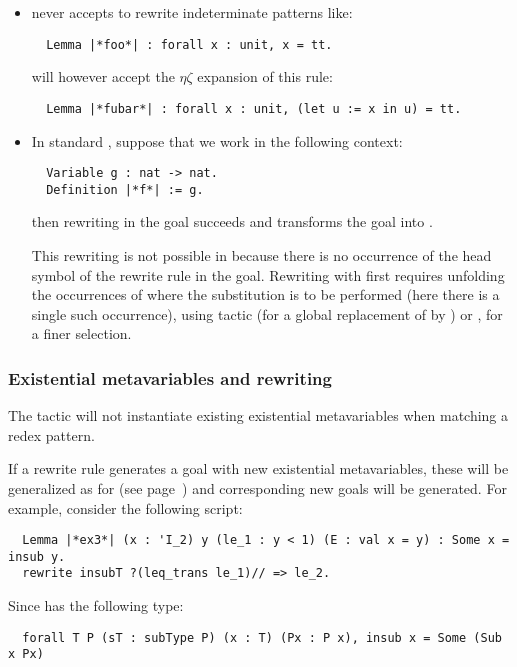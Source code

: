 \begin{itemize}
\item \ssr{} never accepts to rewrite indeterminate patterns like:
\begin{lstlisting}
  Lemma |*foo*| : forall x : unit, x = tt.
\end{lstlisting}
\ssr{} will however accept the $\eta\zeta$ expansion of this rule:
\begin{lstlisting}
  Lemma |*fubar*| : forall x : unit, (let u := x in u) = tt.
\end{lstlisting}
\item In standard \Coq{}, suppose that we work in the following context:
\begin{lstlisting}
  Variable g : nat -> nat.
  Definition |*f*| := g.
\end{lstlisting}
then rewriting  in the goal
 succeeds
and transforms the goal into .

This rewriting is not possible in \ssr{} because there is no
occurrence of the head symbol  of the rewrite rule in the
goal. Rewriting with  first requires unfolding the occurrences of
 where the substitution is to be performed (here there is a single
such occurrence), using tactic  (for a global
replacement of  by ) or , for a
finer selection.
\end{itemize}

\subsubsection*{Existential metavariables and rewriting}
\label{ssec:rewcaveats}
The  tactic will not instantiate existing existential
metavariables when matching a redex pattern.

If a rewrite rule generates a goal
with new existential metavariables, these will be generalized as for 
(see page~\pageref{sssec:apply}) and corresponding new goals will be generated.
For example, consider the following script:

\begin{lstlisting}
  Lemma |*ex3*| (x : 'I_2) y (le_1 : y < 1) (E : val x = y) : Some x = insub y.
  rewrite insubT ?(leq_trans le_1)// => le_2.
\end{lstlisting}

Since  has the following type:

\begin{lstlisting}
  forall T P (sT : subType P) (x : T) (Px : P x), insub x = Some (Sub x Px)
\end{lstlisting}

